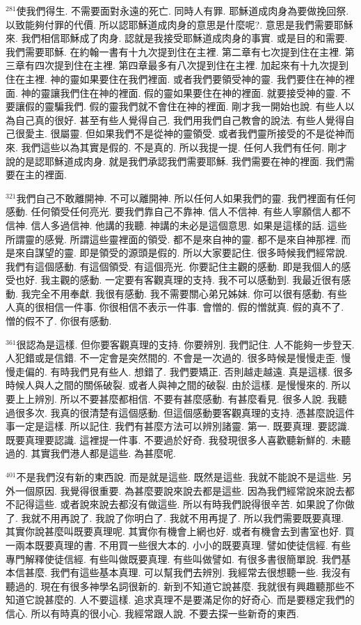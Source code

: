 \documentclass{book}
\begin{document}
$^{281}$使我們得生.
不需要面對永遠的死亡.
同時人有罪.
耶穌道成肉身為要做挽回祭.
以致能夠付罪的代價.
所以認耶穌道成肉身的意思是什麼呢?.
意思是我們需要耶穌來.
我們相信耶穌成了肉身.
認就是我接受耶穌道成肉身的事實.
或是目的和需要.
我們需要耶穌.
在約翰一書有十九次提到住在主裡.
第二章有七次提到住在主裡.
第三章有四次提到住在主裡.
第四章最多有八次提到住在主裡.
加起來有十九次提到住在主裡.
神的靈如果要住在我們裡面.
或者我們要領受神的靈.
我們要住在神的裡面.
神的靈讓我們住在神的裡面.
假的靈如果要住在神的裡面.
就要接受神的靈.
不要讓假的靈騙我們.
假的靈我們就不會住在神的裡面.
剛才我一開始也說.
有些人以為自己真的很好.
甚至有些人覺得自己.
我們用我們自己教會的說法.
有些人覺得自己很愛主.
很屬靈.
但如果我們不是從神的靈領受.
或者我們靈所接受的不是從神而來.
我們這些以為其實是假的.
不是真的.
所以我提一提.
任何人我們有任何.
剛才說的是認耶穌道成肉身.
就是我們承認我們需要耶穌.
我們需要在神的裡面.
我們需要在主的裡面.

$^{321}$我們自己不敢離開神.
不可以離開神.
所以任何人如果我們的靈.
我們裡面有任何感動.
任何領受任何亮光.
要我們靠自己不靠神.
信人不信神.
有些人寧願信人都不信神.
信人多過信神.
他講的我聽.
神講的未必是這個意思.
如果是這樣的話.
這些所謂靈的感覺.
所謂這些靈裡面的領受.
都不是來自神的靈.
都不是來自神那裡.
而是來自謀望的靈.
即是領受的源頭是假的.
所以大家要記住.
很多時候我們經常說.
我們有這個感動.
有這個領受.
有這個亮光.
你要記住主觀的感動.
即是我個人的感受也好.
我主觀的感動.
一定要有客觀真理的支持.
我不可以感動到.
我最近很有感動.
我完全不用奉獻.
我很有感動.
我不需要關心弟兄姊妹.
你可以很有感動.
有些人真的很相信一件事.
你很相信不表示一件事.
會憎的.
假的憎就真.
假的真不了.
憎的假不了.
你很有感動.

$^{361}$很認為是這樣.
但你要客觀真理的支持.
你要辨別.
我們記住.
人不能夠一步登天.
人犯錯或是信錯.
不一定會是突然間的.
不會是一次過的.
很多時候是慢慢走歪.
慢慢走偏的.
有時我們見有些人.
想錯了.
我們要矯正.
否則越走越遠.
真是這樣.
很多時候人與人之間的關係破裂.
或者人與神之間的破裂.
由於這樣.
是慢慢來的.
所以要上上辨別.
所以不要甚麼都相信.
不要有甚麼感動.
有甚麼看見.
很多人說.
我聽過很多次.
我真的很清楚有這個感動.
但這個感動要客觀真理的支持.
憑甚麼說這件事一定是這樣.
所以記住.
我們有甚麼方法可以辨別諸靈.
第一.
既要真理.
要認識.
既要真理要認識.
這裡提一件事.
不要過於好奇.
我發現很多人喜歡聽新鮮的.
未聽過的.
其實我們港人都是這些.
為甚麼呢.

$^{401}$不是我們沒有新的東西說.
而是就是這些.
既然是這些.
我就不能說不是這些.
另外一個原因.
我覺得很重要.
為甚麼要說來說去都是這些.
因為我們經常說來說去都不記得這些.
或者說來說去都沒有做這些.
所以有時我們說得很辛苦.
如果說了你做了.
我就不用再說了.
我說了你明白了.
我就不用再提了.
所以我們需要既要真理.
其實你說甚麼叫既要真理呢.
其實你有機會上網也好.
或者有機會去到書室也好.
買一兩本既要真理的書.
不用買一些很大本的.
小小的既要真理.
譬如使徒信經.
有些專門解釋使徒信經.
有些叫做既要真理.
有些叫做譬如.
有很多書很簡單說.
我們基本信甚麼.
我們有這些基本真理.
可以幫我們去辨別.
我經常去很想聽一些.
我沒有聽過的.
現在有很多神學名詞很新的.
新到不知道它說甚麼.
我就很有興趣聽那些不知道它說甚麼的.
人不要這樣.
追求真理不是要滿足你的好奇心.
而是要穩定我們的信心.
所以有時真的很小心.
我經常跟人說.
不要去探一些新奇的東西.
\end{document}
